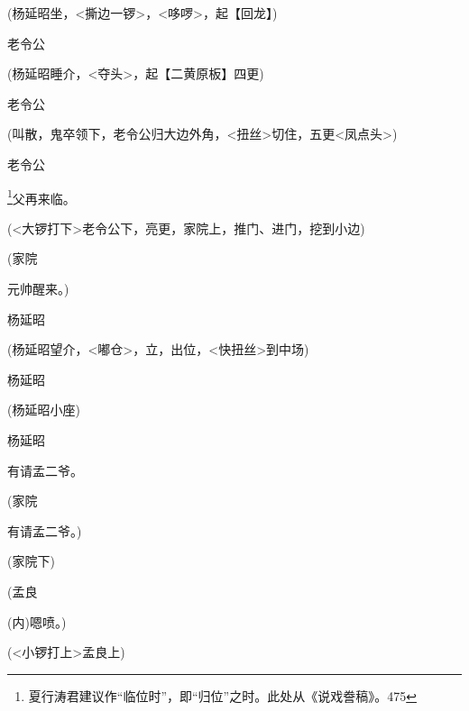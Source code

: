{{(杨延昭坐，\textless{}撕边一锣\textgreater{}，\textless{}哆啰\textgreater{}，起【回龙】)}

{老令公\hspace{20pt}~

 }

{(杨延昭睡介，\textless{}夺头\textgreater{}，起}【{\akai 二黄原板}】{四更)}

{老令公

 }

{(叫散，鬼卒领下，老令公归大边外角，\textless{}扭丝\textgreater{}切住，五更\textless{}凤点头\textgreater{})}

{老令公

\footnote{ 夏行涛君建议作``临位时''，即``归位''之时。此处从《说戏誊稿》。{475}}{父再来临。} }

{(\textless{}大锣打下\textgreater{}老令公下，亮更，家院上，推门、进门，挖到小边)}

{(家院\hspace{30pt}~

元帅醒来。)}

杨延昭\hspace{20pt}~


(杨延昭望介，{\textless{}嘟仓\textgreater{}，}立{，}出位{，\textless{}快扭丝\textgreater{}}到中场)

杨延昭


(杨延昭小座)

杨延昭\hspace{20pt}~

有请孟二爷。

(家院\hspace{30pt}~

有请孟二爷。)

({家院下})

(孟良\hspace{30pt}~

({\akai 内})嗯喷。)

({\textless{}小锣打上\textgreater{}孟良上})

}
